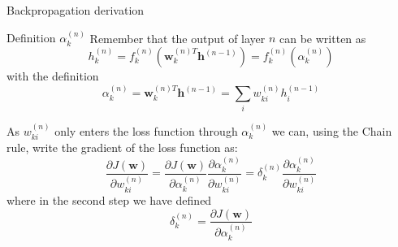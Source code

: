\documentclass[]{beamer}
\begin{document}
\begin{frame}
   {Backpropagation derivation}
   \scriptsize
   \begin{block}
      {Definition $\alpha^{(n)}_k$}
      Remember that the output of layer $n$ can be written as
      \begin{equation*}
         h^{(n)}_k = f^{(n)}_k \left( \boldsymbol{w}^{(n)T}_k \boldsymbol{h}^{(n-1)} \right) 
                   = f^{(n)}_k \left( \alpha^{(n)}_k \right)
      \end{equation*}
      with the definition
      \begin{equation*}
         \alpha^{(n)}_k = \boldsymbol{w}^{(n)T}_k \boldsymbol{h}^{(n-1)} = \sum_i w_{ki}^{(n)} h^{(n-1)}_i
      \end{equation*}
   \end{block}
   
   As $w^{(n)}_{ki}$ only enters the loss function through $\alpha^{(n)}_k$ we can, using the Chain rule, write the gradient of the loss function as:
   \begin{equation*}
      \frac{\partial J\left(\boldsymbol{w} \right)}{\partial w_{ki}^{(n)}} = \frac{\partial J \left( \boldsymbol{w} \right) }{\partial \alpha_k^{(n)} } \frac{\partial \alpha_k^{(n)} }{\partial w_{ki}^{(n)}}
                                                                           = \delta_k^{(n)} \frac{\partial \alpha_k^{(n)} }{\partial w_{ki}^{(n)}}
   \end{equation*}
   where in the second step we have defined
   \begin{equation*}
      \delta_k^{(n)} = \frac{\partial J \left( \boldsymbol{w} \right) }{\partial \alpha^{(n)}_k}
   \end{equation*}


   
\end{frame}
\end{document}
